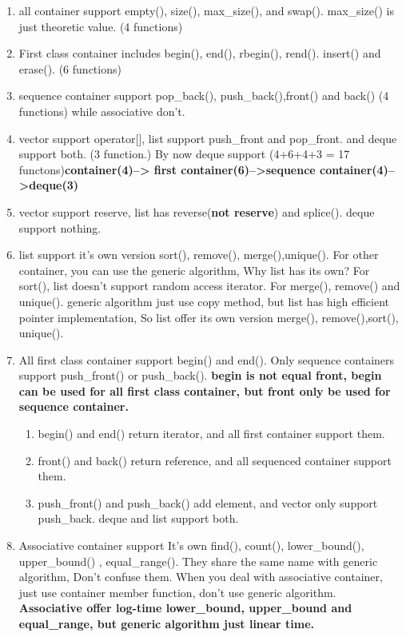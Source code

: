 \documentclass[a4paper,11pt,twoside]{book}
\begin{document}
\begin{itemize}
\begin{enumerate}
\item all container support empty(), size(), max\_size(), and swap(). max\_size() is just theoretic value. (4  functions)
\item First class container includes begin(), end(), rbegin(), rend(). insert() and erase(). (6 functions)
\item sequence container support pop\_back(), push\_back(),front() and back() (4 functions)
 while associative don't.
\item vector support operator[], list support push\_front and pop\_front. and deque support both. (3 function.)  By now deque support (4+6+4+3 = 17 functons)\textbf{container(4)--> first container(6)-->sequence container(4)-->deque(3)}
\item vector support reserve, list has reverse(\textbf{not reserve}) and splice().  deque support nothing.
\item list support it's own  version sort(), remove(), merge(),unique(). For other container, you can use the generic algorithm, Why list has its own? For sort(), list doesn't support random access iterator. For merge(), remove() and unique(). generic algorithm just use copy method, but list has high efficient pointer implementation, So list offer its own version merge(), remove(),sort(), unique().

\item All first class container support begin() and end(). Only sequence containers support push\_front() or push\_back(). \textbf{begin is not equal front, begin can be used for all first class container, but front only be used for sequence container.}

\begin{enumerate}
\item begin() and end() return iterator, and all first container support them.
\item front() and back() return reference, and all sequenced container support them.
\item push\_front() and push\_back() add element, and vector only support push\_back. deque and list support both.
\end{enumerate}


\item Associative container support It's own find(), count(),  lower\_bound(), upper\_bound() , equal\_range(). They share the same name with generic algorithm, Don't confuse them. When you deal with associative container, just use container member function, don't use generic algorithm. \textbf{Associative offer log-time lower\_bound, upper\_bound and equal\_range, but generic algorithm just linear time.}



\end{enumerate}
\end{itemize}
\end{document}
